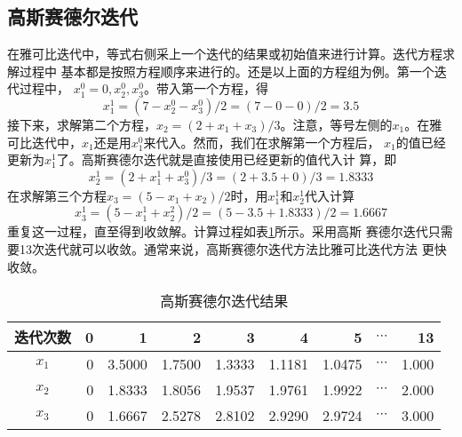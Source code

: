 \subsection{高斯赛德尔迭代}
在雅可比迭代中，等式右侧采上一个迭代的结果或初始值来进行计算。迭代方程求解过程中
基本都是按照方程顺序来进行的。还是以上面的方程组为例。第一个迭代过程中，
$x_{1}^{0}=0,x_{2}^{0},x_{3}^{0}$。带入第一个方程，得
\begin{equation}
  x_{1}^{1} = (7-x_{2}^{0}-x_{3}^{0})/2 = (7-0-0)/2=3.5
\end{equation}
接下来，求解第二个方程，$x_{2}=(2+x_{1}+x_{3})/3$。注意，等号左侧的$x_{1}$。在雅
可比迭代中，$x_{1}$还是用$x_{1}^{0}$来代入。然而，我们在求解第一个方程后，
$x_{1}$的值已经更新为$x_{1}^{1}$了。高斯赛德尔迭代就是直接使用已经更新的值代入计
算，即
\begin{equation}
  x_{2}^{1} = (2+x_{1}^{1}+x_{3}^{0})/3=(2+3.5+0)/3 = 1.8333
\end{equation}
在求解第三个方程$x_{3}=(5-x_{1}+x_{2})/2$时，用$x_{1}^{1}$和$x_{2}^{1}$代入计算
\begin{equation}
  x_{3}^{1} = (5-x_{1}^{1}+x_{2}^{2})/2=(5-3.5+1.8333)/2=1.6667
\end{equation}
重复这一过程，直至得到收敛解。计算过程如表\ref{TbLA_Gauss_result}所示。采用高斯
赛德尔迭代只需要13次迭代就可以收敛。通常来说，高斯赛德尔迭代方法比雅可比迭代方法
更快收敛。
\begin{table}[!ht]
  \begin{center}
  \caption{高斯赛德尔迭代结果}
  \label{TbLA_Gauss_result}
  \begin{tabular}{|c|r|r|r|r|r|r|r|r|}
    \hline
    迭代次数 & 0 & 1 & 2 & 3 & 4 & 5 & $\cdots$ & 13 \\
    \hline
    $x_{1}$ & 0 & 3.5000 & 1.7500 & 1.3333 & 1.1181 & 1.0475 & $\cdots$ & 1.000
    \\
    \hline
    $x_{2}$ & 0 & 1.8333 & 1.8056 & 1.9537 & 1.9761 & 1.9922 & $\cdots$ & 2.000
    \\
    \hline
    $x_{3}$ & 0 & 1.6667 & 2.5278 & 2.8102 & 2.9290 & 2.9724 & $\cdots$ & 3.000
    \\
    \hline
  \end{tabular}
  \end{center}
\end{table}

